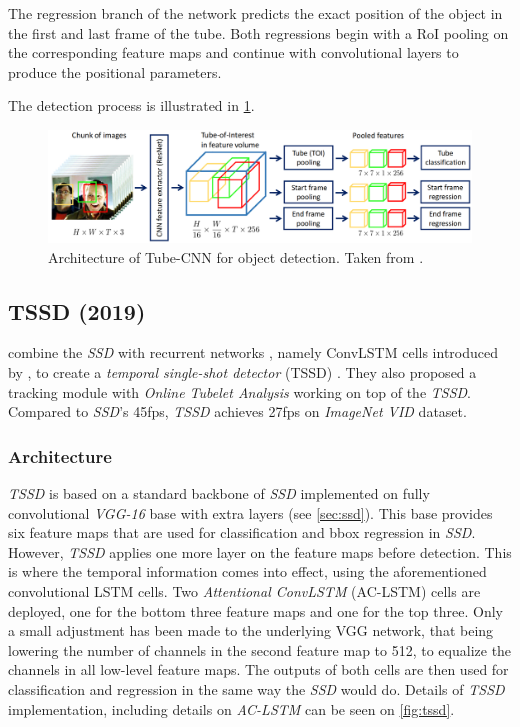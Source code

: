 The regression branch of the network predicts the exact position of the object in the first and last frame of the tube. Both regressions begin with a RoI pooling on the corresponding feature maps and continue with convolutional layers to produce the positional parameters. 

The detection process is illustrated in \cref{fig:tubecnn}.


\begin{figure}
    \centering
    \includegraphics[width=\textwidth]{img/tubecnn}
    \caption{Architecture of Tube-CNN for object detection. Taken from \cite[fig.~2]{bib:tubeCNN}.}
    \label{fig:tubecnn}
\end{figure}


\subsection{TSSD (2019)}
\label{tssd}
\citeauthor{bib:tssd} combine the \textit{SSD} with recurrent networks \cite[chpt.~10]{bib:dlbook}, namely ConvLSTM cells introduced by \citeauthor{bib:convlstm} \cite{bib:convlstm}, to create a \textit{temporal single-shot detector} (TSSD) \cite{bib:tssd}. They also proposed a tracking module with \textit{Online Tubelet Analysis} working on top of the \textit{TSSD}.
Compared to \textit{SSD}'s 45fps, \textit{TSSD} achieves 27fps on \textit{ImageNet VID} dataset.  

\subsubsection{Architecture}
\textit{TSSD} is based on a standard backbone of \textit{SSD} implemented on fully convolutional \textit{VGG-16} base with extra layers (see \cref{sec:ssd}). This base provides six feature maps that are used for classification and bbox regression in \textit{SSD}. However, \textit{TSSD} applies one more layer on the feature maps before detection. This is where the temporal information comes into effect, using the aforementioned convolutional LSTM cells. Two \textit{Attentional ConvLSTM} (AC-LSTM) cells are deployed, one for the bottom three feature maps and one for the top three. Only a small adjustment has been made to the underlying VGG network, that being lowering the number of channels in the second feature map to 512, to equalize the channels in all low-level feature maps. The outputs of both cells are then used for classification and regression in the same way the \textit{SSD} would do. Details of \textit{TSSD} implementation, including details on \textit{AC-LSTM} can be seen on \cref{fig:tssd}. 

